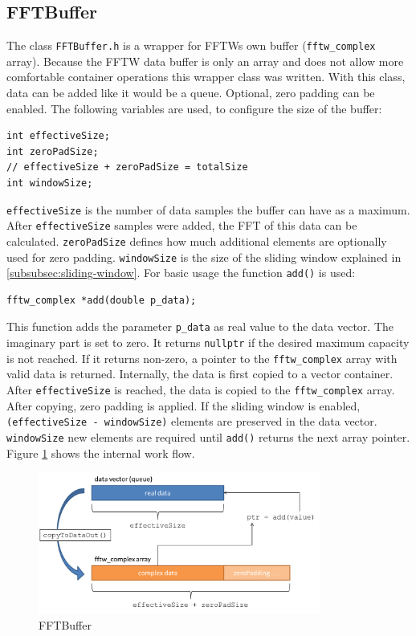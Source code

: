 \documentclass[notitlepage]{scrreprt}
\begin{document}
\subsection{FFTBuffer}
\label{subsec:fft-buffer}
The class \lstinline{FFTBuffer.h} is a wrapper for FFTWs own buffer (\lstinline{fftw_complex} array). Because the FFTW data buffer is only an array and does not allow more comfortable container operations this wrapper class was written. With this class, data can be added like it would be a queue. Optional, zero padding can be enabled. The following variables are used, to configure the size of the buffer:

\begin{lstlisting}
int effectiveSize;
int zeroPadSize;
// effectiveSize + zeroPadSize = totalSize
int windowSize;
\end{lstlisting}

\lstinline{effectiveSize} is the number of data samples the buffer can have as a maximum. After \lstinline{effectiveSize} samples were added, the FFT of this data can be calculated. \lstinline{zeroPadSize} defines how much additional elements are optionally used for zero padding. \lstinline{windowSize} is the size of the sliding window explained in \ref{subsubsec:sliding-window}. For basic usage the function \lstinline{add()} is used:

\begin{lstlisting}
fftw_complex *add(double p_data);
\end{lstlisting}

This function adds the parameter \lstinline{p_data} as real value to the data vector. The imaginary part is set to zero. It returns \lstinline{nullptr} if the desired maximum capacity is not reached. If it returns non-zero, a pointer to the \lstinline{fftw_complex} array with valid data is returned. Internally, the data is first copied to a vector container. After \lstinline{effectiveSize} is reached, the data is copied to the \lstinline{fftw_complex} array. After copying, zero padding is applied. If the sliding window is enabled, \lstinline{(effectiveSize - windowSize)} elements are preserved in the data vector. \lstinline{windowSize} new elements are required until \lstinline{add()} returns the next array pointer. Figure \ref{fig:fft-buffer} shows the internal work flow.

\begin{figure}[H]
	\centering
	\includegraphics[width=350px]{images/FFTBuffer.png}
	\caption{FFTBuffer}
	\label{fig:fft-buffer}
\end{figure}
\end{document}
